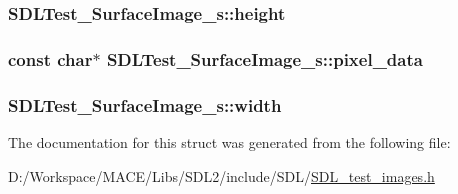 \subsubsection[{\texorpdfstring{height}{height}}]{ S\+D\+L\+Test\+\_\+\+Surface\+Image\+\_\+s\+::height}\hypertarget{struct_s_d_l_test___surface_image__s_a310092874695556e4b7f1f63aec24213}{}\label{struct_s_d_l_test___surface_image__s_a310092874695556e4b7f1f63aec24213}
\subsubsection[{\texorpdfstring{pixel\+\_\+data}{pixel_data}}]{\setlength{\rightskip}{0pt plus 5cm}const char$\ast$ S\+D\+L\+Test\+\_\+\+Surface\+Image\+\_\+s\+::pixel\+\_\+data}\hypertarget{struct_s_d_l_test___surface_image__s_acf2d3006bea5690f564d3003d1512fa7}{}\label{struct_s_d_l_test___surface_image__s_acf2d3006bea5690f564d3003d1512fa7}
\subsubsection[{\texorpdfstring{width}{width}}]{ S\+D\+L\+Test\+\_\+\+Surface\+Image\+\_\+s\+::width}\hypertarget{struct_s_d_l_test___surface_image__s_a3cbacf6b015a22832ab4d3f509719609}{}\label{struct_s_d_l_test___surface_image__s_a3cbacf6b015a22832ab4d3f509719609}


The documentation for this struct was generated from the following file\+:\begin{DoxyCompactItemize}
\item 
D\+:/\+Workspace/\+M\+A\+C\+E/\+Libs/\+S\+D\+L2/include/\+S\+D\+L/\hyperlink{_s_d_l__test__images_8h}{S\+D\+L\+\_\+test\+\_\+images.\+h}\end{DoxyCompactItemize}
